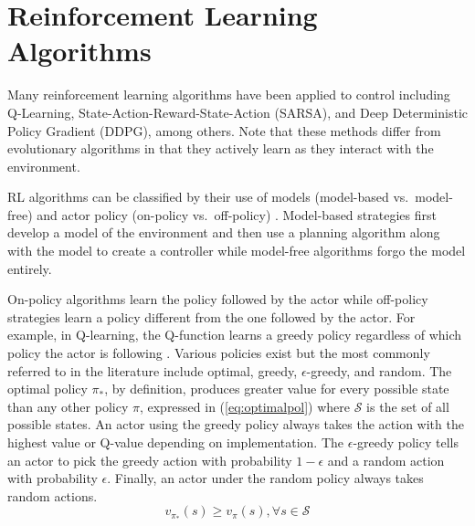 \section{Reinforcement Learning Algorithms}
Many reinforcement learning algorithms have been applied to control including Q-Learning, State-Action-Reward-State-Action (SARSA), and Deep Deterministic Policy Gradient (DDPG), among others. Note that these methods differ from evolutionary algorithms in that they actively learn as they interact with the environment.

RL algorithms can be classified by their use of models (model-based vs.\ model-free) and actor policy (on-policy vs.\ off-policy) \cite{sutton_2017}. Model-based strategies first develop a model of the environment and then use a planning algorithm along with the model to create a controller while model-free algorithms forgo the model entirely.

On-policy algorithms learn the policy followed by the actor while off-policy strategies learn a policy different from the one followed by the actor. For example, in Q-learning, the Q-function learns a greedy policy regardless of which policy the actor is following \cite{sutton_2017}. Various policies exist but the most commonly referred to in the literature include optimal, greedy, $\epsilon$-greedy, and random. The optimal policy $\pi_*$, by definition, produces greater value for every possible state than any other policy $\pi$, expressed in (\ref{eq:optimalpol}) where $\mathcal{S}$ is the set of all possible states. An actor using the greedy policy always takes the action with the highest value or Q-value depending on implementation. The $\epsilon$-greedy policy tells an actor to pick the greedy action with probability $1-\epsilon$ and a random action with probability $\epsilon$. Finally, an actor under the random policy always takes random actions.
\begin{equation}
	\label{eq:optimalpol}
v_{\pi_*}(s) \geq v_{\pi}(s), \forall s \in \mathcal{S}
\end{equation}

